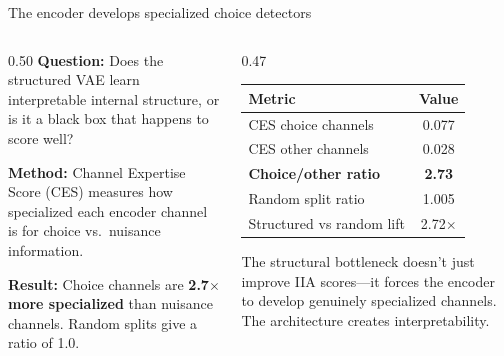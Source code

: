 \documentclass[aspectratio=169,11pt]{beamer}
\begin{document}
\begin{frame}{The encoder develops specialized choice detectors}
\begin{columns}[T]
\begin{column}{0.50\textwidth}
\textbf{Question:} Does the structured VAE learn interpretable internal structure, or is it a black box that happens to score well?

\vspace{0.5em}
\textbf{Method:} Channel Expertise Score (CES) measures how specialized each encoder channel is for choice vs.\ nuisance information.

\vspace{0.5em}
\textbf{Result:} Choice channels are \textbf{2.7$\times$ more specialized} than nuisance channels. Random splits give a ratio of 1.0.
\end{column}

\begin{column}{0.47\textwidth}
\vspace{0.5em}
{\small
\begin{tabular}{lc}
\toprule
\textbf{Metric} & \textbf{Value} \\
\midrule
CES choice channels & 0.077 \\
CES other channels & 0.028 \\
\textbf{Choice/other ratio} & \textbf{2.73} \\
Random split ratio & 1.005 \\
Structured vs random lift & 2.72$\times$ \\
\bottomrule
\end{tabular}
}

\vspace{0.5em}
{\small The structural bottleneck doesn't just improve IIA scores---it forces the encoder to develop genuinely specialized channels. The architecture creates interpretability.}
\end{column}
\end{columns}
\end{frame}
\end{document}
